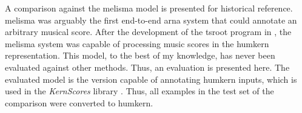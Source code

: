 
A comparison against the \gls{melisma} model is presented
for historical reference. \gls{melisma} was arguably the
first end-to-end \gls{arna} system that could annotate an
arbitrary musical score. After the development of the
\gls{tsroot} program in \textcite{sapp2009tsroot}, the
\gls{melisma} system was capable of processing music scores
in the \gls{humkern} representation. This model, to the best
of my knowledge, has never been evaluated against other
methods. Thus, an evaluation is presented here. The
evaluated model is the version capable of annotating
\gls{humkern} inputs, which is used in the \emph{KernScores}
library \parencite{sapp2005online}. Thus, all examples in
the test set of the comparison were converted to
\gls{humkern}. 
